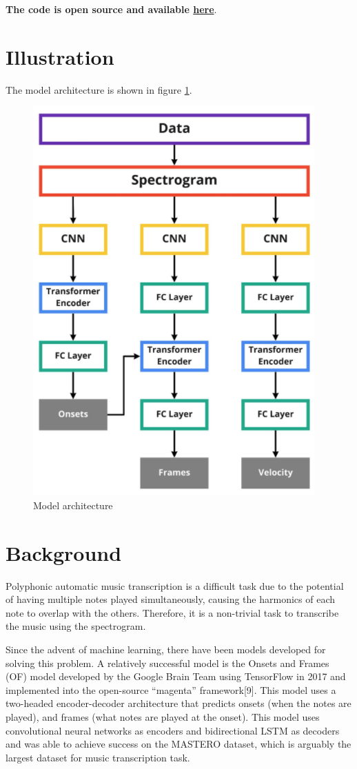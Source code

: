 \documentclass[a4paper,twocolumn,10pt]{article}
\begin{document}
\textbf{The code is open source and available \href{https://github.com/jonah-chen/midi-shark/}{here}}.
\section{Illustration}
The model architecture is shown in figure \ref{fig:architecture}.
\begin{figure}[h!]
  \centering
  \includegraphics[width=0.7\linewidth]{figures/architecture.png}
  \caption{Model architecture}
  \label{fig:architecture}
\end{figure}

\section{Background}
Polyphonic automatic music transcription is a difficult task due to the potential of having multiple notes played simultaneously, causing the harmonics of each note to overlap with the others. Therefore, it is a non-trivial task to transcribe the music using the spectrogram. 

Since the advent of machine learning, there have been models developed for solving this problem. A relatively successful model is the Onsets and Frames (OF) model developed by the Google Brain Team using TensorFlow in 2017 and implemented into the open-source “magenta” framework[9]. This model uses a two-headed encoder-decoder architecture that predicts onsets (when the notes are played), and frames (what notes are played at the onset). This model uses convolutional neural networks as encoders and bidirectional LSTM as decoders and was able to achieve success on the MASTERO dataset, which is arguably the largest dataset for music transcription task.
\end{document}
